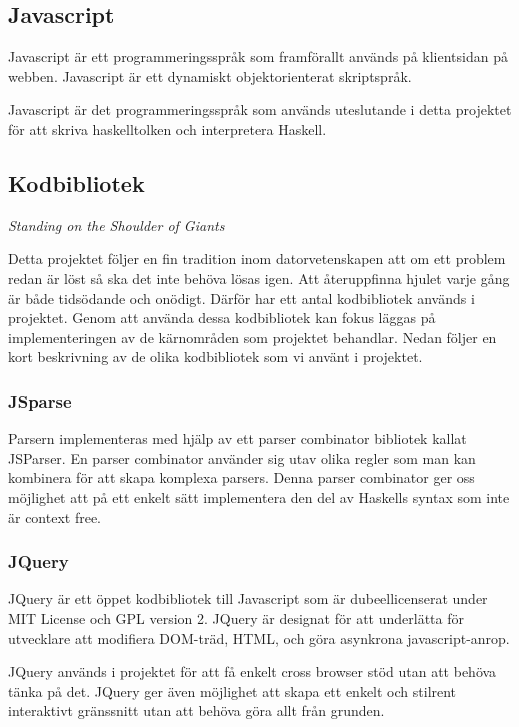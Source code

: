 \subsection{Javascript} 
Javascript \citep{javascript} är ett programmeringsspråk som framförallt används på klientsidan på webben. Javascript är ett dynamiskt objektorienterat skriptspråk.

Javascript är det programmeringsspråk som används uteslutande i detta projektet för att skriva haskelltolken och interpretera Haskell.

\subsection{Kodbibliotek}

\emph{Standing on the Shoulder of Giants}

Detta projektet följer en fin tradition inom datorvetenskapen att om ett problem redan är löst så ska det inte behöva lösas igen. Att återuppfinna hjulet varje gång är både tidsödande och onödigt. 
Därför har ett antal kodbibliotek används i projektet. 
Genom att använda dessa kodbibliotek kan fokus läggas på implementeringen av de kärnområden som projektet behandlar.
Nedan följer en kort beskrivning av de olika kodbibliotek som vi använt i projektet.

 \subsubsection{JSparse}  
Parsern implementeras med hjälp av ett parser combinator bibliotek kallat JSParser.
En parser combinator använder sig utav olika regler som man kan kombinera för att skapa komplexa parsers. 
Denna parser combinator ger oss möjlighet att på ett enkelt sätt
implementera den del av  Haskells syntax som inte är context free.

\subsubsection{JQuery} 

JQuery är ett öppet kodbibliotek till Javascript som är dubeellicenserat under MIT License och GPL version 2.  
JQuery är designat för att underlätta för utvecklare att modifiera DOM-träd, HTML, och göra asynkrona javascript-anrop.

JQuery används i projektet för att få enkelt cross browser stöd utan att behöva tänka på det. 
JQuery ger även möjlighet att skapa ett enkelt och stilrent interaktivt gränssnitt utan att behöva göra allt från grunden.







